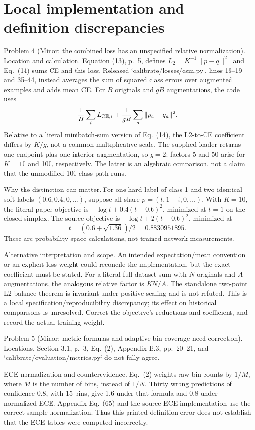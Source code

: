 \documentclass[10pt]{article}
\begin{document}
\section*{Local implementation and definition discrepancies}
Problem 4 (Minor: the combined loss has an unspecified relative normalization).  Location and calculation. Equation (13), p. 5, defines \(L_2=K^{-1}\|p-q\|^2\), and Eq. (14) sums CE and this loss. Released `calibrate/losses/csm.py`, lines 18–19 and 35–44, instead averages the sum of squared class errors over augmented examples and adds mean CE. For \(B\) originals and \(gB\) augmentations, the code uses \[\frac1B\sum_i L_{{\rm CE},i}
 +\frac1{gB}\sum_a\|p_a-q_a\|^2 .\] Relative to a literal minibatch-sum version of Eq. (14), the L2-to-CE coefficient differs by \(K/g\), not a common multiplicative scale. The supplied loader returns one endpoint plus one interior augmentation, so \(g=2\): factors 5 and 50 arise for \(K=10\) and 100, respectively. The latter is an algebraic comparison, not a claim that the unmodified 100-class path runs.\par
Why the distinction can matter. For one hard label of class 1 and two identical soft labels \((0.6,0.4,0,\ldots)\), suppose all share \(p=(t,1-t,0,\ldots)\). With \(K=10\), the literal paper objective is \(-\log t+0.4(t-0.6)^2\), minimized at \(t=1\) on the closed simplex. The source objective is \(-\log t+2(t-0.6)^2\), minimized at \[t=(0.6+\sqrt{1.36})/2=0.8830951895.\] These are probability-space calculations, not trained-network measurements.\par
Alternative interpretation and scope. An intended expectation/mean convention or an explicit loss weight could reconcile the implementation, but the exact coefficient must be stated. For a literal full-dataset sum with \(N\) originals and \(A\) augmentations, the analogous relative factor is \(KN/A\). The standalone two-point L2 balance theorem is invariant under positive scaling and is not refuted. This is a local specification/reproducibility discrepancy; its effect on historical comparisons is unresolved. Correct the objective’s reductions and coefficient, and record the actual training weight.\par
Problem 5 (Minor: metric formulas and adaptive-bin coverage need correction).  Locations. Section 3.1, p. 3, Eq. (2), Appendix B.3, pp. 20–21, and `calibrate/evaluation/metrics.py` do not fully agree.\par
ECE normalization and counterevidence. Eq. (2) weights raw bin counts by \(1/M\), where \(M\) is the number of bins, instead of \(1/N\). Thirty wrong predictions of confidence \(0.8\), with 15 bins, give 1.6 under that formula and 0.8 under normalized ECE. Appendix Eq. (65) and the source ECE implementation use the correct sample normalization. Thus this printed definition error does not establish that the ECE tables were computed incorrectly.\par
\end{document}
